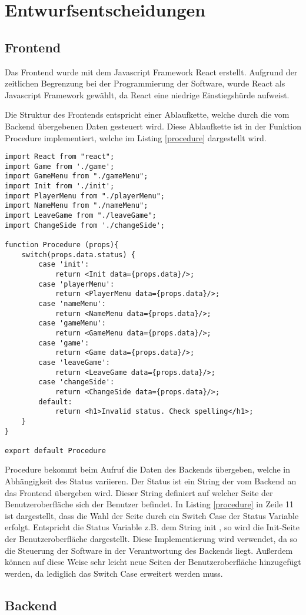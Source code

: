 \chapter{Entwurfsentscheidungen}
\section{Frontend}
Das Frontend wurde mit dem Javascript Framework React erstellt. Aufgrund der zeitlichen Begrenzung bei der Programmierung der Software, wurde React als Javascript Framework gewählt, da React eine niedrige Einstiegshürde aufweist. 

Die Struktur des Frontends entspricht einer Ablaufkette, welche durch die vom Backend übergebenen Daten gesteuert wird. Diese Ablaufkette ist in der Funktion Procedure implementiert, welche im Listing \ref{procedure} dargestellt wird. 

\begin{lstlisting}[caption={Procedure Funktion des Frontends},captionpos=b]
import React from "react";
import Game from './game';
import GameMenu from "./gameMenu";
import Init from './init';
import PlayerMenu from "./playerMenu";
import NameMenu from "./nameMenu";
import LeaveGame from "./leaveGame";
import ChangeSide from './changeSide';

function Procedure (props){
    switch(props.data.status) {
        case 'init':
            return <Init data={props.data}/>;
        case 'playerMenu':
            return <PlayerMenu data={props.data}/>;
        case 'nameMenu':
            return <NameMenu data={props.data}/>;
        case 'gameMenu':
            return <GameMenu data={props.data}/>;
        case 'game':
            return <Game data={props.data}/>;
        case 'leaveGame':
            return <LeaveGame data={props.data}/>;
        case 'changeSide':
            return <ChangeSide data={props.data}/>;
        default:
            return <h1>Invalid status. Check spelling</h1>;
    }
}

export default Procedure
\end{lstlisting}
\label{procedure}

Procedure bekommt beim Aufruf die Daten des Backends übergeben, welche in Abhängigkeit des Status variieren. Der Status ist ein String der vom Backend an das Frontend übergeben wird. Dieser String definiert auf welcher Seite der Benutzeroberfläche sich der Benutzer befindet. In Listing \ref{procedure} in Zeile 11 ist dargestellt, dass die Wahl der Seite durch ein Switch Case der Status Variable erfolgt. Entspricht die Status Variable z.B. dem String \glqq init\grqq{} , so wird die Init-Seite der Benutzeroberfläche dargestellt. Diese Implementierung wird verwendet, da so die Steuerung der Software in der Verantwortung des Backends liegt. Außerdem können auf diese Weise sehr leicht neue Seiten der Benutzeroberfläche hinzugefügt werden, da lediglich das Switch Case erweitert werden muss.

\section{Backend}